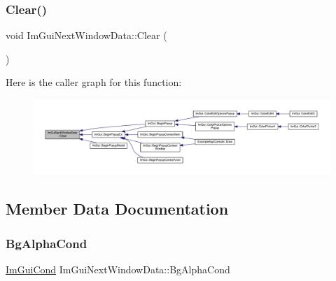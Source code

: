 \subsubsection{\texorpdfstring{Clear()}{Clear()}}
{\footnotesize\ttfamily void Im\+Gui\+Next\+Window\+Data\+::\+Clear (\begin{DoxyParamCaption}{ }\end{DoxyParamCaption})\hspace{0.3cm}{\ttfamily [inline]}}

Here is the caller graph for this function\+:
\nopagebreak
\begin{figure}[H]
\begin{center}
\leavevmode
\includegraphics[width=350pt]{struct_im_gui_next_window_data_ae20d7287a7f96592363988f138e11bd5_icgraph}
\end{center}
\end{figure}


\subsection{Member Data Documentation}
\mbox{\label{struct_im_gui_next_window_data_af494d38cf5dcfb9cd7e08de5c6c17b31}} 
\subsubsection{\texorpdfstring{Bg\+Alpha\+Cond}{BgAlphaCond}}
{\footnotesize\ttfamily \mbox{\hyperlink{imgui_8h_aef890d6ac872e12c5804d0b3e4f7f103}{Im\+Gui\+Cond}} Im\+Gui\+Next\+Window\+Data\+::\+Bg\+Alpha\+Cond}

\mbox{\label{struct_im_gui_next_window_data_a3597005fb1cdd4d3fa06296bbbb5a2c2}} 

